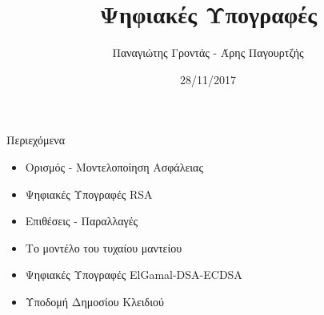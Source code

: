 \documentclass[handout]{beamer}
\title{Ψηφιακές Υπογραφές}
\author{Παναγιώτης Γροντάς - Άρης Παγουρτζής}
\date{28/11/2017}
\institute{ΕΜΠ - Κρυπτογραφία - (2017-2018)}
\begin{document}
\newcommand{\xor}{ \oplus }
\newcommand{\msg}{ \mathtt{M} }
\newcommand{\KEY}{ \mathtt{K} }
\newcommand{\CPH}{ \mathtt{C} }
\newcommand{\keygen}{\mathtt{KeyGen}}
\newcommand{\enc}{\mathtt{Encrypt}}
\newcommand{\dec}{\mathtt{Decrypt}}
\newcommand{\sign}{\mathtt{Sign}}
\newcommand{\verify}{\mathtt{Verify}}
\newcommand{\adv}{$\mathcal{A}$ }
\newcommand{\Hash}{\mathcal{H} }
\newcommand{\advb}{$\mathcal{B}$ }
\newcommand{\chal}{$\mathcal{C}$ }
\newcommand{\cs}{$\mathcal{CS}$}
\newcommand{\Zed}{\mathbb{Z}} 
\newcommand{\zns}{\mathbb{Z}^*_n}
\newcommand{\zs}[1]{\mathbb{Z}^*_{#1}}

\newcommand{\green}[1]{\textcolor{teal}{#1}}
\newcommand{\Green}[1]{\textcolor{Teal}{#1}}
\newcommand{\ForestGreen}[1]{\textcolor{ForestGreen}{#1}}
\newcommand{\blue}[1]{\textcolor{blue}{#1}}
\newcommand{\magenta}[1]{\textcolor{magenta}{#1}}
\newcommand{\cyan}[1]{\textcolor{cyan}{#1}}

\newcommand{\twopartdef}[4]
{ 
		\begin{cases}
			#1 , #2 \\
			#3 , #4
		\end{cases} 
}
\begin{frame}
\titlepage
\end{frame}

\begin{frame}{Περιεχόμενα}
\begin{itemize}
\item Ορισμός - Μοντελοποίηση Ασφάλειας
\pause
\item Ψηφιακές Υπογραφές RSA
\pause
\item Επιθέσεις - Παραλλαγές
\pause
\item Το μοντέλο του τυχαίου μαντείου
\pause
\item Ψηφιακές Υπογραφές ElGamal-DSA-ECDSA
\pause
\item Υποδομή Δημοσίου Κλειδιού
  
\end{itemize}
\end{frame}
\end{document}
